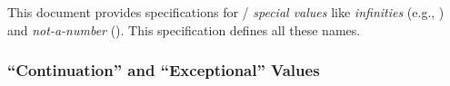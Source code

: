 \documentclass[../Description.tex]{subfiles}
\begin{document}
This document provides specifications for \IEEEFPStd{}/\IECFPStd{}
\emph{special values} like \emph{infinities} (e.g.,
) and \emph{not-a-number}
().  This specification defines all these names.

\subsubsection{``Continuation'' and ``Exceptional'' Values}


\end{document}
